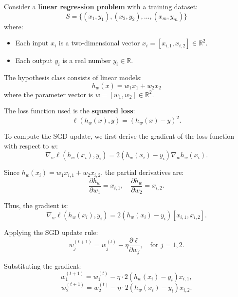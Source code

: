 \documentclass[a4paper,11pt,oneside]{book}
\begin{document}
\begin{enumerate}
                \begin{solution}
                    Consider a \textbf{linear regression problem} with a training dataset:
                    \[
                    S = \{(x_1, y_1), (x_2, y_2), \dots, (x_m, y_m)\}
                    \]
                    where:
                    \begin{itemize}
                        \item Each input $x_i$ is a two-dimensional vector $x_i = [x_{i,1}, x_{i,2}] \in \mathbb{R}^2$.
                        \item Each output $y_i$ is a real number $y_i \in \mathbb{R}$.
                    \end{itemize}
                    
                    The hypothesis class consists of linear models:
                    \[
                    h_w(x) = w_1 x_1 + w_2 x_2
                    \]
                    where the parameter vector is $w = [w_1, w_2] \in \mathbb{R}^2$.
                    
                    The loss function used is the \textbf{squared loss}:
                    \[
                    \ell(h_w(x), y) = (h_w(x) - y)^2.
                    \]
                    
                    To compute the SGD update, we first derive the gradient of the loss function with respect to $w$:
                    \[
                    \nabla_w \ell(h_w(x_i), y_i) = 2 (h_w(x_i) - y_i) \nabla_w h_w(x_i).
                    \]
                    
                    Since $h_w(x_i) = w_1 x_{i,1} + w_2 x_{i,2}$, the partial derivatives are:
                    \[
                    \frac{\partial h_w}{\partial w_1} = x_{i,1}, \quad \frac{\partial h_w}{\partial w_2} = x_{i,2}.
                    \]
                    
                    Thus, the gradient is:
                    \[
                    \nabla_w \ell(h_w(x_i), y_i) = 2 (h_w(x_i) - y_i) [x_{i,1}, x_{i,2}].
                    \]
                    
                    Applying the SGD update rule:
                    \[
                    w_j^{(t+1)} = w_j^{(t)} - \eta \frac{\partial \ell}{\partial w_j}, \quad \text{for } j = 1, 2.
                    \]
                    
                    Substituting the gradient:
                    \[
                    w_1^{(t+1)} = w_1^{(t)} - \eta \cdot 2 (h_w(x_i) - y_i) x_{i,1},
                    \]
                    \[
                    w_2^{(t+1)} = w_2^{(t)} - \eta \cdot 2 (h_w(x_i) - y_i) x_{i,2}.
                    \]
                    

\end{solution}
\end{enumerate}
\end{document}

